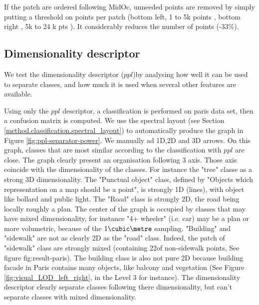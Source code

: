 		If the patch are ordered following MidOc, unneeded points are removed by simply putting a threshold on points per patch (bottom left, 1 to 5k points \per \cubic \meter , bottom right , 5k to 24 k pts \per \cubic \meter). It considerably reduces the number of points (-33\%). 
	
	\subsection{Dimensionality descriptor}
		\label{result.dim_descriptor}
		We test the dimensionality descriptor ($ppl$)by analysing how well it
		can be used to separate classes, and how much it is used when 
		several other features are available.
		
		
		Using only the $ppl$ descriptor, a classification is performed on paris data set, then a confusion matrix is computed.
		We use the spectral layout (see Section \ref{method.classification.spectral_layout}) to automatically produce the graph in Figure \ref{fig:ppl-separator-power}. 
		We manually ad 1D,2D and 3D arrows.
		On this graph, classes that are most similar according to the classification with $ppl$ are close. The graph clearly present an organisation following 3 axis. Those axis coincide with the dimensionality of the classes. For instance the "tree" classe as a strong 3D dimensionality. The "Punctual object" class, defined by "Objects which representation on a map should be a point", is strongly 1D (lines), with object like bollard and public light. The "Road" class is strongly 2D, the road being locally roughly a plan. The center of the graph is occupied by classes that may have mixed dimensionality, for instance "4+ wheeler" (i.e. car) may be a plan or more volumetric, because of the $1 \cubic \metre$ sampling.
		"Building" and "sidewalk" are not as clearly 2D as  the "road" class. Indeed, the patch of "sidewalk" class are strongly mixed (containing 22\mypercent of non-sidewalk points, See figure fig:result-paris). The building class is also not pure 2D because building facade in Paris contains many objects, like balcony and vegetation (See Figure \ref{fig:visual_LOD_left_right}, in the Level 3 for instance).
		The dimensionality descriptor clearly separate classes following there dimensionality, but can't separate classes with mixed dimensionality.
		
